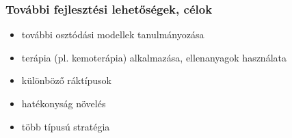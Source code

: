\begin{frame}
\frametitle{További fejlesztési lehetőségek, célok}
\begin{itemize}
	\item további osztódási modellek tanulmányozása
	\item terápia (pl. kemoterápia) alkalmazása, ellenanyagok használata
	\item különböző ráktípusok
	\item hatékonyság növelés
	\item több típusú stratégia
\end{itemize}

\end{frame}